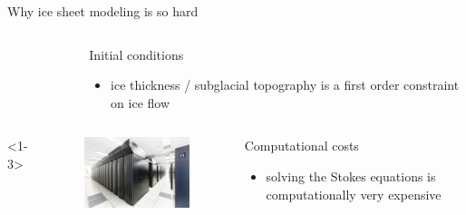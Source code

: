 \documentclass[hide notes,intlimits]{beamer}
\begin{document}
\begin{frame}{Why ice sheet modeling is so hard}
\begin{columns}[c]
\begin{column}{.28\linewidth}
\begin{figure}
        \end{figure}
      \end{column}
      \begin{column}{.67\linewidth}
        \begin{block}{Initial conditions}
        \begin{itemize}
        \item ice thickness / subglacial topography is a first order constraint on ice flow
        \end{itemize}
      \end{block}
      \end{column}
    \end{columns}
    \begin{columns}[c]<1-3>
      \begin{column}{.3\linewidth}
        \begin{figure}
          \includegraphics[width=\linewidth]{bw_front_sm}
        \end{figure}
      \end{column}
      \begin{column}{.67\linewidth}
        \begin{block}{Computational costs}
        \begin{itemize}
        \item solving the Stokes equations is computationally very expensive
        \end{itemize}
      \end{block}
      \end{column}
    \end{columns}
\end{frame}
\end{document}
